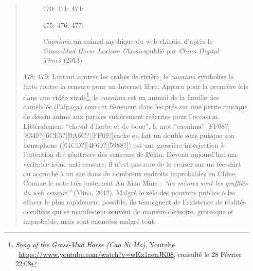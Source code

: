 \begin{quote}
\begin{description}
\begin{figure}
{470:     }
471:     
474:     \caption[\textit{Caonima}: un animal mythique du web chinois]{\textit{Caonima}: un animal mythique du web chinois, d{\textquoteright}apr\`es le \textit{Grass-Mud Horse Lexicon Classics}publi\'e par \textit{China Digital Times }(2013)}
475:     \label{fig:caonima}
476: 
477: \end{figure}
478: 
479: Luttant contres les crabes de rivi\`ere, le \textit{caonima }symbolise la lutte contre la censure pour un Internet libre. Apparu pour la premi\`ere fois dans une vid\'eo virale\footnote{ \textit{Song of the Grass-Mud Horse (Cao Ni Ma), }Youtube \ \url{https://www.youtube.com/watch?v=wKx1aenJK08}, consult\'e le 28 F\'evrier 22:08\par }, le \textit{caonima} est un animal de la famille des cam\'elid\'es (l{\textquoteright}alpaga) courant fi\`erement dans les pr\'es sur une petite musique de dessin anim\'e aux paroles enti\`erement r\'e\'ecrites pour l{\textquoteright}occasion. Litt\'eralement {\textquotedblleft}cheval d{\textquoteright}herbe et de boue{\textquotedblright}, le mot {\textquotedblleft}caonima{\textquotedblright} [FF08?][8349?][6CE5?][9A6C?][FF09?]cache en fait un double sens puisque son homophone ([64CD?][4F60?][5988?]) est une grossi\`ere interjection \`a l{\textquoteright}intention des g\'enitrices des censeurs de P\'ekin. Devenu aujourd{\textquoteright}hui une v\'eritable ic\^one anti-censure, il n{\textquoteright}est pas rare de le croiser sur un tee-shirt ou accroch\'e \`a un sac dans de nombreux endroits improbables en Chine. Comme le note tr\`es justement An Xiao Mina : \textit{{\textquotedblleft}les m\`emes sont les graffitis du web censur\'e{\textquotedblright}} (Mina, 2012). Malgr\'e le z\`ele des pouvoirs publics \`a les effacer le plus rapidement possible, ils t\'emoignent de l{\textquoteright}existence de r\'ealit\'es occult\'ees qui se manifestent souvent de mani\`ere d\'erisoire, grotesque et improbable, mais sont \'enonc\'ees malgr\'e tout. 

\end{description}
\end{quote}
